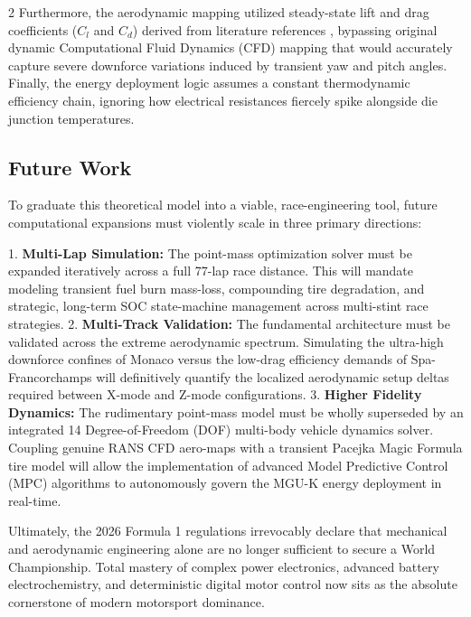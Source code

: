 \begin{multicols}{2}
Furthermore, the aerodynamic mapping utilized steady-state lift and drag coefficients ($C_l$ and $C_d$) derived from literature references \cite{cfd_methodology_lit}, bypassing original dynamic Computational Fluid Dynamics (CFD) mapping that would accurately capture severe downforce variations induced by transient yaw and pitch angles. Finally, the energy deployment logic assumes a constant thermodynamic efficiency chain, ignoring how electrical resistances fiercely spike alongside die junction temperatures.

\subsection{Future Work}

To graduate this theoretical model into a viable, race-engineering tool, future computational expansions must violently scale in three primary directions:

1. \textbf{Multi-Lap Simulation:} The point-mass optimization solver must be expanded iteratively across a full 77-lap race distance. This will mandate modeling transient fuel burn mass-loss, compounding tire degradation, and strategic, long-term SOC state-machine management across multi-stint race strategies.
2. \textbf{Multi-Track Validation:} The fundamental architecture must be validated across the extreme aerodynamic spectrum. Simulating the ultra-high downforce confines of Monaco versus the low-drag efficiency demands of Spa-Francorchamps will definitively quantify the localized aerodynamic setup deltas required between X-mode and Z-mode configurations.
3. \textbf{Higher Fidelity Dynamics:} The rudimentary point-mass model must be wholly superseded by an integrated 14 Degree-of-Freedom (DOF) multi-body vehicle dynamics solver. Coupling genuine RANS CFD aero-maps with a transient Pacejka Magic Formula tire model will allow the implementation of advanced Model Predictive Control (MPC) algorithms to autonomously govern the MGU-K energy deployment in real-time.

Ultimately, the 2026 Formula 1 regulations irrevocably declare that mechanical and aerodynamic engineering alone are no longer sufficient to secure a World Championship. Total mastery of complex power electronics, advanced battery electrochemistry, and deterministic digital motor control now sits as the absolute cornerstone of modern motorsport dominance.
\end{multicols}
